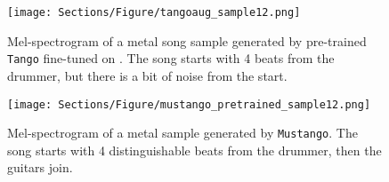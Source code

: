 \documentclass[11pt]{article}
\newcommand{\model}{\texttt{Mustango}}
\begin{document}
\begin{figure}[h]
    \centering
    \texttt{[image: Sections/Figure/tangoaug\_sample12.png]}
    \caption{Mel-spectrogram of a metal song sample generated by pre-trained \texttt{Tango} fine-tuned on \dataset{}. The song starts with 4 beats from the drummer, but there is a bit of noise from the start.}
    \label{fig:sample_tangoaug2}
\end{figure}

\begin{figure}[h]
    \centering
    \texttt{[image: Sections/Figure/mustango\_pretrained\_sample12.png]}
    \caption{Mel-spectrogram of a metal sample generated by \model{}. The song starts with 4 distinguishable beats from the drummer, then the guitars join.}
    \label{fig:sample_mustango2}
\end{figure}
\end{document}
